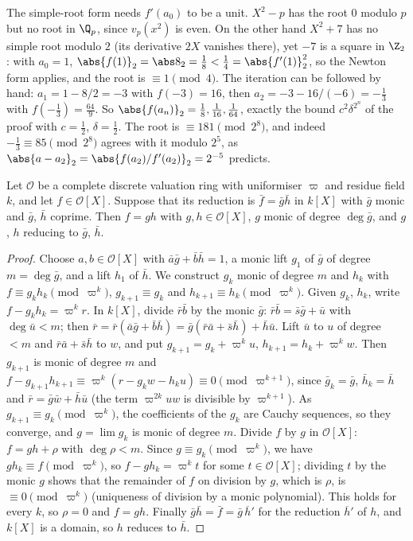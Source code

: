 \begin{warning}\label{warn:local:hensel}
The simple-root form needs $f'(a_0)$ to be a unit. $X^2-p$ has the root $0$ modulo $p$ but no root in $\Q_p$, since $v_p(x^2)$ is even. On the
other hand $X^2+7$ has no simple root modulo $2$ (its derivative $2X$ vanishes there), yet $-7$ is a square in $\Z_2$: with $a_0=1$,
$\abs{f(1)}_2=\abs8_2=\frac18<\frac14=\abs{f'(1)}_2^2$, so the Newton form applies, and the root is $\equiv1\pmod4$. The iteration can be followed by
hand: $a_1=1-8/2=-3$ with $f(-3)=16$, then $a_2=-3-16/(-6)=-\frac13$ with $f(-\frac13)=\frac{64}9$. So $\abs{f(a_n)}_2=\frac18,\frac1{16},\frac1{64}$,
exactly the bound $c^2\delta^{2^n}$ of the proof with $c=\frac12$, $\delta=\frac12$. The root is $\equiv181\pmod{2^8}$, and indeed
$-\frac13\equiv85\pmod{2^8}$ agrees with it modulo $2^5$, as $\abs{a-a_2}_2=\abs{f(a_2)/f'(a_2)}_2=2^{-5}$ predicts.
\end{warning}

\begin{theorem}\label{thm:local:hensel-factor}
Let $\mathcal O$ be a complete discrete valuation ring with uniformiser $\varpi$ and residue field $k$, and let $f\in\mathcal O[X]$. Suppose that its
reduction is $\bar f=\bar g\bar h$ in $k[X]$ with $\bar g$ monic and $\bar g$, $\bar h$ coprime. Then $f=gh$ with $g,h\in\mathcal O[X]$, $g$ monic of
degree $\deg\bar g$, and $g$, $h$ reducing to $\bar g$, $\bar h$.
\end{theorem}

\begin{proof}
Choose $a,b\in\mathcal O[X]$ with $\bar a\bar g+\bar b\bar h=1$, a monic lift $g_1$ of $\bar g$ of degree $m=\deg\bar g$, and a lift $h_1$ of $\bar h$. We
construct $g_k$ monic of degree $m$ and $h_k$ with $f\equiv g_kh_k\pmod{\varpi^k}$, $g_{k+1}\equiv g_k$ and $h_{k+1}\equiv h_k\pmod{\varpi^k}$. Given $g_k$,
$h_k$, write $f-g_kh_k=\varpi^kr$. In $k[X]$, divide $\bar r\bar b$ by the monic $\bar g$: $\bar r\bar b=\bar s\bar g+\bar u$ with $\deg\bar u<m$; then
$\bar r=\bar r(\bar a\bar g+\bar b\bar h)=\bar g(\bar r\bar a+\bar s\bar h)+\bar h\bar u$. Lift $\bar u$ to $u$ of degree $<m$ and $\bar r\bar a+\bar s\bar h$ to $w$,
and put $g_{k+1}=g_k+\varpi^ku$, $h_{k+1}=h_k+\varpi^kw$. Then $g_{k+1}$ is monic of degree $m$ and
$f-g_{k+1}h_{k+1}\equiv\varpi^k(r-g_kw-h_ku)\equiv0\pmod{\varpi^{k+1}}$, since $\bar g_k=\bar g$, $\bar h_k=\bar h$ and $\bar r=\bar g\bar w+\bar h\bar u$ (the
term $\varpi^{2k}uw$ is divisible by $\varpi^{k+1}$). As $g_{k+1}\equiv g_k\pmod{\varpi^k}$, the coefficients of the $g_k$ are Cauchy sequences, so they converge, and
$g=\lim g_k$ is monic of degree $m$. Divide $f$ by $g$ in $\mathcal O[X]$: $f=gh+\rho$ with $\deg\rho<m$. Since $g\equiv g_k\pmod{\varpi^k}$, we have
$gh_k\equiv f\pmod{\varpi^k}$, so $f-gh_k=\varpi^kt$ for some $t\in\mathcal O[X]$; dividing $t$ by the monic $g$ shows that the remainder of $f$ on
division by $g$, which is $\rho$, is $\equiv0\pmod{\varpi^k}$ (uniqueness of division by a monic polynomial). This holds for every $k$, so $\rho=0$
and $f=gh$. Finally $\bar g\bar h=\bar f=\bar g\,\overline{h}'$ for the reduction $\overline h'$ of $h$, and $k[X]$ is a domain, so $h$ reduces to $\bar h$.
\end{proof}

